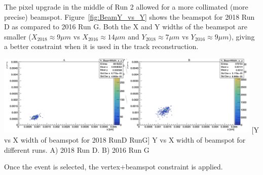 The pixel upgrade in the middle of Run 2 allowed for a more collimated (more precise) \pp beamspot.
Figure~\ref{fig:BeamY_vs_Y} shows the beamspot for 2018 Run D as compared to 2016 Run G.
Both the X and Y widths of the beamspot are smaller ($X_{2018} \approx 9 \mu m$ vs $X_{2016} \approx 14 \mu m$ and $Y_{2018} \approx 7 \mu m$ vs $Y_{2016} \approx 9 \mu m$), giving a better constraint when it is used in the track reconstruction.
\begin{multiFigure}
    \centering
        \includegraphics[width=0.96\textwidth]{figures/higgsmassmeas/vxbs/beamspot_width_2016RunG_vs_2018RunD.png}
        [Y vs X width of beamspot for 2018 RunD  RunG]
        {Y vs X width of beamspot for different runs.
        \;A) 2018 Run D.
        \;B) 2016 Run G}
    \label{fig:BeamY_vs_Y}
\end{multiFigure}
Once the event is selected, the vertex+beamspot constraint is applied.


